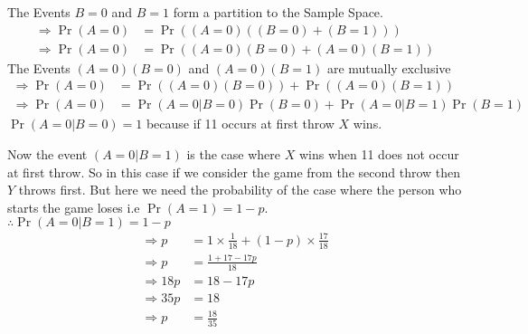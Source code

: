 \documentclass{beamer}
\providecommand{\pr}[1]{\ensuremath{\Pr\left(#1\right)}}
\begin{document}
\begin{frame}
The Events $B=0$ and $B=1$ form a partition to the Sample Space. \\
\begin{align}
\Rightarrow \pr{A=0} &= \pr{(A=0)((B=0)+(B=1))} \\
\Rightarrow \pr{A=0} &= \pr{(A=0)(B=0)+(A=0)(B=1)}
\end{align}
The Events $(A=0)(B=0)$ and $(A=0)(B=1)$ are mutually exclusive 
\begin{align}
\Rightarrow \pr{A=0} &= \pr{(A=0)(B=0)} + \pr{(A=0)(B=1)} \\
\Rightarrow \pr{A=0} &= \pr{A=0|B=0}\pr{B=0} + \pr{A=0|B=1}\pr{B=1}
\end{align}
$\pr{A=0|B=0} = 1$ because  if 11 occurs at first throw $X$ wins.\\
\end{frame}
\begin{frame}
Now the event $(A=0|B=1)$ is the case where $X$ wins when 11 does not occur at first throw. So in this case if we consider the game from the second throw then $Y$ throws first. But here we need the probability of the case where the person who starts the game loses i.e $\pr{A=1} = 1-p $.\\
$\therefore \pr{A=0|B=1} = 1-p $
\begin{align}
\Rightarrow p &= 1 \times \frac{1}{18} + (1-p) \times \frac{17}{18}\\
\Rightarrow p &= \frac{1 + 17 - 17p}{18} \\
\Rightarrow 18p &= 18 - 17p \\
\Rightarrow 35p &= 18 \\
\Rightarrow p &= \frac{18}{35}
\end{align}
\end{frame}
\end{document}

